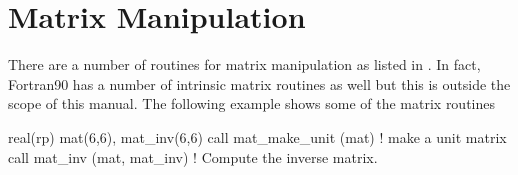 \section{Matrix Manipulation}
\label{s:matrix}

There are a number of \bmad routines for matrix manipulation as listed
in . In fact, Fortran90 has a number of intrinsic matrix
routines as well but this is outside the scope of this manual. The
following example shows some of the \bmad matrix routines
\begin{example}
  real(rp) mat(6,6), mat_inv(6,6)
  call mat_make_unit (mat)    ! make a unit matrix
  call mat_inv (mat, mat_inv) ! Compute the inverse matrix.
\end{example}